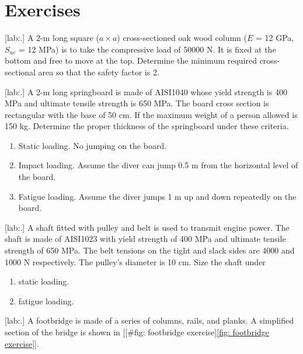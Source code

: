 \documentclass[a4paper,openany,12pt]{book}
\begin{document}
{{\section{Exercises}
\label{exercises-4}
[lab:.] A 2-m long square
(\(a \times a\)) cross-sectioned oak wood column (\(E\) = 12 GPa, \(S_{uc}\) =
12 MPa) is to take the compressive load of 50000 N. It is fixed at the
bottom and free to move at the top. Determine the minimum required
cross-sectional area so that the safety factor is 2.


[lab:.] A 2-m long springboard is
made of AISI1040 whose yield strength is 400 MPa and ultimate tensile
strength is 650 MPa. The board cross section is rectangular with the
base of 50 cm. If the maximum weight of a person allowed is 150 kg.
Determine the proper thickness of the springboard under these criteria.



\begin{enumerate}
\item Static loading. No jumping on the board.

\item Impact loading. Assume the diver can jump 0.5 m from the horizontal
level of the board.

\item Fatigue loading. Assume the diver jumps 1 m up and down repeatedly on
the board.
\end{enumerate}

[lab:.] A shaft fitted with pulley
and belt is used to transmit engine power. The shaft is made of AISI1023
with yield strength of 400 MPa and ultimate tensile strength of 650 MPa.
The belt tensions on the tight and slack sides are 4000 and 1000 N
respectively. The pulley's diameter is 10 cm. Size the shaft under



\begin{enumerate}
\item static loading.

\item fatigue loading.
\end{enumerate}

[lab:.] A
footbridge is made of a series of columns, rails, and planks. A
simplified section of the bridge is shown in
[[\#fig: footbridge exercise]\ref{fig: footbridge exercise}].


}}
\end{document}
